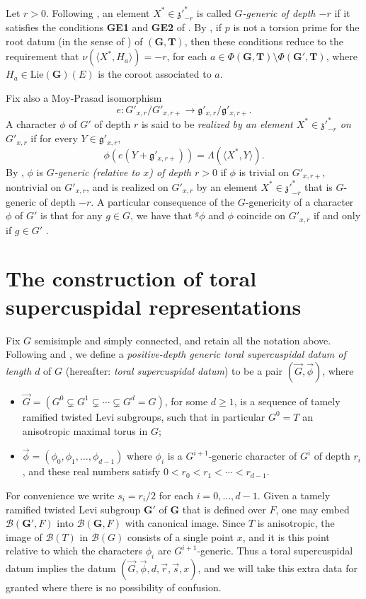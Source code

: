 \documentclass[12pt]{amsart}
\newcommand{\ratk}{F}
\newcommand{\extk}{E}
\newcommand{\GG}{\mathbf{G}} %
\newcommand{\LieG}{\mathfrak{g}}
\newcommand{\mz}{\mathfrak{z}}
\newcommand{\Lie}{\mathrm{Lie}}
\newcommand{\TT}{\mathbf{T}} %
\newcommand{\buil}{\mathcal{B}}
\theoremstyle{plain}
\theoremstyle{definition}
\theoremstyle{remark}
\numberwithin{equation}{section}
\numberwithin{figure}{section}
\begin{document}
Let $r>0$.  Following \cite[Definition 3.7]{HakimMurnaghan2008}, an element $X^* \in {\mz'}^*_{-r}$ is called \emph{$G$-generic of depth $-r$} if it satisfies the conditions \textbf{GE1} and \textbf{GE2} of \cite[\S8]{Yu2001}. By \cite[Lemma 8.1]{Yu2001}, if $p$ is not a torsion prime for the root datum (in the sense of \cite{Springer1977}) of $(\GG,\TT)$, then these conditions reduce to the requirement that $\nu(\langle X^*, H_a\rangle) = -r$, for each $a \in \Phi(\GG,\TT)\setminus\Phi(\GG',\TT)$, where $H_a \in \Lie(\GG)(\extk)$ is the coroot associated to $a$.   

 Fix also a Moy-Prasad isomorphism \cite[\S 2.6]{HakimMurnaghan2008}
$$
e \colon G'_{x,r}/G'_{x,r+} \to \LieG'_{x,r}/\LieG'_{x,r+}.
$$
A character $\phi$ of $G'$ of depth $r$ is said to be \emph{realized by an element $X^* \in {\mz'}^{*}_{-r}$ on $G'_{x,r}$} if 
for every $Y \in \LieG'_{x,r}$, 
$$
\phi(e(Y+\LieG'_{x,r+})) = \Lambda(\langle X^*, Y\rangle).
$$
By \cite[Definition 3.9]{HakimMurnaghan2008}, $\phi$ is \emph{$G$-generic (relative to $x$) of depth $r>0$} if $\phi$ is trivial on $G'_{x,r+}$, nontrivial on $G'_{x,r}$, and is realized on $G'_{x,r}$ by an element $X^* \in {\mz'}^{*}_{-r}$ that is $G$-generic of depth $-r$.  
A particular consequence of the $G$-genericity of a character $\phi$ of $G'$ is that for any $g\in G$, we have that ${}^g\phi$ and $\phi$ coincide on $G'_{x,r}$ if and only if $g\in G'$ \cite[Lemma 8.3]{Yu2001}.

 
 \section{The construction of toral supercuspidal representations}\label{S:construction}

Fix $G$ semisimple and simply connected, and retain all the notation above.  Following \cite[\S3]{Yu2001} and \cite[\S3.1]{HakimMurnaghan2008}, we define a \emph{positive-depth generic toral supercuspidal datum of length $d$} of $G$ (hereafter: \emph{toral supercuspidal datum}) to be a pair $(\vec{G}, \vec{\phi})$, where
 \begin{itemize}
\item $\vec{G} = (G^0\subsetneq G^1 \subsetneq \cdots \subsetneq G^d=G)$, for some $d \geq 1$, is a sequence of tamely ramified twisted Levi subgroups, such that in particular $G^0=T$ an anisotropic maximal torus in $G$;  
\item $\vec{\phi} = (\phi_0, \phi_1, \ldots, \phi_{d-1})$ where $\phi_i$ is a $G^{i+1}$-generic character of $G^i$ of depth $r_i$, and these real numbers satisfy $0<r_0<r_1 < \cdots < r_{d-1}$.
\end{itemize}
For convenience we write $s_i = r_i/2$ for each $i = 0, \ldots, d-1$.   
Given a tamely ramified twisted Levi subgroup $\GG'$ of $\GG$ that is defined over $\ratk$,  one may embed $\buil(\GG',\ratk)$ into $\buil(\GG,\ratk)$ with canonical image.  Since $T$ is anisotropic, the image of $\buil(T)$ in $\buil(G)$ consists of a single point $x$, and it is this point relative to which the characters $\phi_i$ are $G^{i+1}$-generic. 
Thus a toral supercuspidal datum implies the datum $(\vec{G}, \vec{\phi}, d, \vec{r}, \vec{s}, x)$, and we will take this extra data for granted where there is no possibility of confusion.
\end{document}
